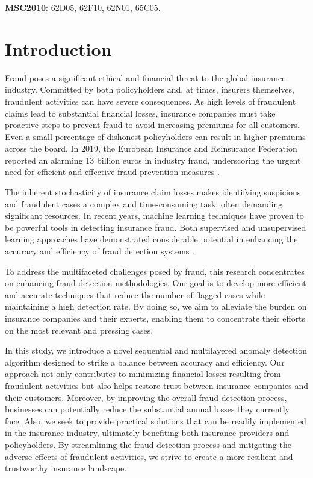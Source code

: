 \documentclass[12pt]{article}
\begin{document}
{\bf MSC2010}: {62D05, 62F10, 62N01, 65C05.}

\section{Introduction}

Fraud poses a significant ethical and financial threat to the
global insurance industry. Committed by both policyholders and, at
times, insurers themselves, fraudulent activities can have severe
consequences. As high levels of fraudulent claims lead to
substantial financial losses, insurance companies must take
proactive steps to prevent fraud to avoid increasing premiums for
all customers. Even a small percentage of dishonest policyholders
can result in higher premiums across the board. In 2019, the
European Insurance and Reinsurance Federation reported an alarming
13 billion euros in industry fraud, underscoring the urgent need
for efficient and effective fraud prevention measures \cite{A61}.

The inherent stochasticity of insurance claim losses makes
identifying suspicious and fraudulent cases a complex and
time-consuming task, often demanding significant resources. In recent years, machine learning techniques have
proven to be powerful tools in detecting insurance fraud. Both
supervised and unsupervised learning approaches have demonstrated
considerable potential in enhancing the accuracy and efficiency of
fraud detection systems \cite{A61}.



To address the multifaceted challenges posed by fraud, this
research concentrates on enhancing fraud detection methodologies.
Our goal is to develop more efficient and accurate techniques that
reduce the number of flagged cases while maintaining a high
detection rate. By doing so, we aim to alleviate the burden on
insurance companies and their experts, enabling them to
concentrate their efforts on the most relevant and pressing cases.

In this study, we introduce a novel sequential and multilayered
anomaly detection algorithm designed to strike a balance between
accuracy and efficiency. Our approach not only contributes to
minimizing financial losses resulting from fraudulent activities
but also helps restore trust between insurance companies and their
customers. Moreover, by improving the overall fraud detection
process, businesses can potentially reduce the substantial annual
losses they currently face. Also, we seek to provide practical
solutions that can be readily implemented in the insurance
industry, ultimately benefiting both insurance providers and
policyholders. By streamlining the fraud detection process and
mitigating the adverse effects of fraudulent activities, we strive
to create a more resilient and trustworthy insurance landscape.
\end{document}
